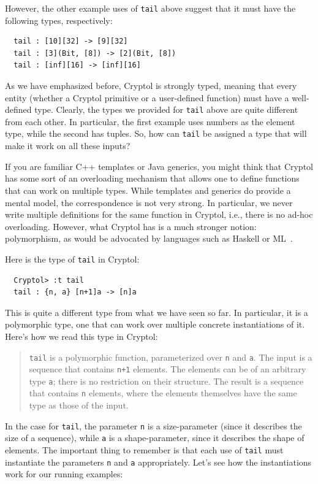 However, the other example uses of {\tt tail} above suggest that it
must have the following types, respectively:
\begin{Verbatim}
  tail : [10][32] -> [9][32]
  tail : [3](Bit, [8]) -> [2](Bit, [8])
  tail : [inf][16] -> [inf][16]
\end{Verbatim}

As we have emphasized before, Cryptol is strongly typed, meaning that
every entity (whether a Cryptol primitive or a user-defined function)
must have a well-defined type. Clearly, the types we provided for
\texttt{tail} above are quite different from each other. In particular, the
first example uses numbers as the element type, while the second has
tuples. So, how can \texttt{tail} be assigned a type that will make it
work on all these inputs?

If you are familiar C++ templates or Java generics, you might think
that Cryptol has some sort of an overloading mechanism that allows one
to define functions that can work on multiple types. While templates
and generics do provide a mental model, the correspondence is not very
strong. In particular, we never write multiple definitions for the
same function in Cryptol, i.e., there is no ad-hoc
overloading. However, what Cryptol has is a much stronger notion:
polymorphism, as would be advocated by languages such as Haskell or
ML~\cite{ML,Has98}.\indPolymorphism\indOverloading

Here is the type of {\tt tail} in Cryptol:
\begin{Verbatim}
  Cryptol> :t tail
  tail : {n, a} [n+1]a -> [n]a
\end{Verbatim}
This is quite a different type from what we have seen so far. In
particular, it is a polymorphic type, one that can work over multiple
concrete instantiations of it. Here's how we read this type in
Cryptol:
\begin{quote} \texttt{tail} is a polymorphic function, parameterized over
  \texttt{n} and \texttt{a}. The input is a sequence that contains
  \texttt{n+1} elements. The elements can be of an arbitrary type
  \texttt{a}; there is no restriction on their structure. The result
  is a sequence that contains \texttt{n} elements, where the elements
  themselves have the same type as those of the input.
\end{quote}
In the case for \texttt{tail}, the parameter \texttt{n} is a size-parameter
(since it describes the size of a sequence), while \texttt{a} is a
shape-parameter, since it describes the shape of elements. The
important thing to remember is that each use of \texttt{tail} must
instantiate the parameters \texttt{n} and \texttt{a} appropriately. Let's
see how the instantiations work for our running examples:


